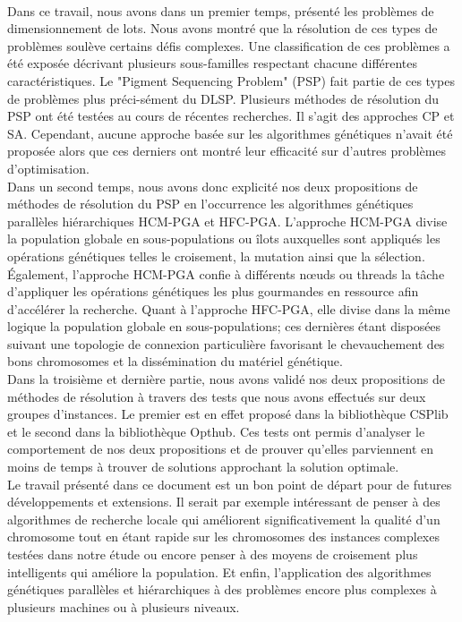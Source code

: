 \paragraph{}
Dans ce travail, nous avons dans un premier temps, présenté	les problèmes de dimensionnement de lots. Nous avons montré que la résolution de ces types de problèmes soulève certains défis complexes. Une classification de ces problèmes a été exposée décrivant plusieurs sous-familles respectant chacune différentes caractéristiques. Le "Pigment Sequencing Problem" (PSP) fait partie de ces types de problèmes plus préci-sément du DLSP. Plusieurs méthodes de résolution du PSP ont été testées au cours de récentes recherches. Il s'agit des approches CP et SA. Cependant, aucune approche basée sur les algorithmes génétiques n'avait été proposée alors que ces derniers ont montré leur efficacité sur d'autres problèmes d'optimisation.\\
	\hspace*{.5cm} Dans un second temps, nous avons donc explicité nos deux propositions de méthodes de résolution du PSP en l’occurrence les algorithmes génétiques parallèles hiérarchiques HCM-PGA et HFC-PGA. L'approche HCM-PGA divise la population globale en sous-populations ou îlots auxquelles sont appliqués les opérations génétiques telles le croisement, la mutation ainsi que la sélection. Également, l'approche HCM-PGA confie à différents nœuds ou threads la tâche d'appliquer les opérations génétiques les plus gourmandes en ressource afin d'accélérer la recherche. Quant à l'approche HFC-PGA, elle divise dans la même logique la population globale en sous-populations; ces dernières étant disposées suivant une topologie de connexion particulière favorisant le chevauchement des bons chromosomes et la dissémination du matériel génétique.\\
	\hspace*{.5cm} Dans la troisième et dernière partie, nous avons validé nos deux propositions de méthodes de résolution à travers des tests que nous avons effectués sur deux groupes d'instances. Le premier est en effet proposé dans la bibliothèque CSPlib et le second dans la bibliothèque Opthub. Ces tests ont permis d'analyser le comportement de nos deux propositions et de prouver qu'elles parviennent en moins de temps à trouver de solutions approchant la solution optimale.\\
	\hspace*{.5cm}Le travail présenté dans ce document est un bon point de départ pour de futures développements et extensions. Il serait par exemple intéressant de penser à des algorithmes de recherche locale qui améliorent significativement la qualité d'un chromosome tout en étant rapide sur les chromosomes des instances complexes testées dans notre étude ou encore penser à des moyens de croisement plus intelligents qui améliore la population. Et enfin, l'application des algorithmes génétiques parallèles et hiérarchiques à des problèmes encore plus complexes à plusieurs machines ou à plusieurs niveaux. 